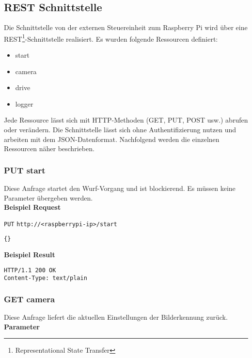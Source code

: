 \subsection{REST Schnittstelle}
\label{sec:rest-schnittstelle}
Die Schnittstelle von der externen Steuereinheit zum Raspberry Pi wird über eine REST\footnote{Representational State Transfer}-Schnittstelle realisiert. Es wurden folgende Ressourcen definiert:
\begin{itemize}
	\item start
	\item camera
	\item drive
	\item logger
\end{itemize}
Jede Ressource lässt sich mit HTTP-Methoden (GET, PUT, POST usw.) abrufen oder verändern. Die Schnittstelle lässt sich ohne Authentifizierung nutzen und arbeiten mit dem JSON-Datenformat. Nachfolgend werden die einzelnen Ressourcen näher beschrieben.


\subsubsection{PUT start}
Diese Anfrage startet den Wurf-Vorgang und ist blockierend. Es müssen keine Parameter übergeben werden.\\
 
\textbf{Beispiel Request}

\texttt{PUT}
\texttt{http://<raspberrypi-ip>/start}

\begin{lstlisting}[caption=PUT start Request, tabsize=2]
{}
\end{lstlisting}

\textbf{Beispiel Result}

\begin{lstlisting}[caption=PUT start Response, tabsize=2]
HTTP/1.1 200 OK
Content-Type: text/plain
\end{lstlisting}





\subsubsection{GET camera}
Diese Anfrage liefert die aktuellen Einstellungen der Bilderkennung zurück.\\

\textbf{Parameter}

